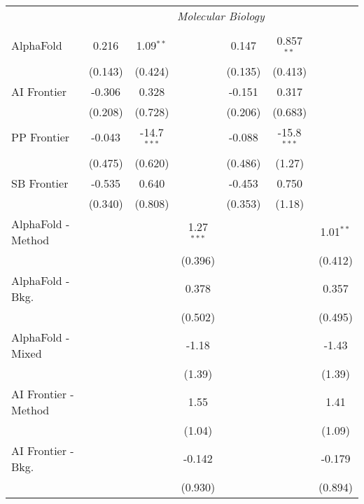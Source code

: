 \begin{tabular}{lcccccc}
 & \multicolumn{6}{c}{\textit{Molecular Biology}} \\ \\
   AlphaFold            & 0.216   & 1.09$^{**}$   &               & 0.147   & 0.857$^{**}$  &   \\   
                        & (0.143) & (0.424)       &               & (0.135) & (0.413)       &   \\   
   AI Frontier          & -0.306  & 0.328         &               & -0.151  & 0.317         &   \\   
                        & (0.208) & (0.728)       &               & (0.206) & (0.683)       &   \\   
   PP Frontier          & -0.043  & -14.7$^{***}$ &               & -0.088  & -15.8$^{***}$ &   \\   
                        & (0.475) & (0.620)       &               & (0.486) & (1.27)        &   \\   
   SB Frontier          & -0.535  & 0.640         &               & -0.453  & 0.750         &   \\   
                        & (0.340) & (0.808)       &               & (0.353) & (1.18)        &   \\   
   AlphaFold - Method   &         &               & 1.27$^{***}$  &         &               & 1.01$^{**}$\\   
                        &         &               & (0.396)       &         &               & (0.412)\\   
   AlphaFold - Bkg.     &         &               & 0.378         &         &               & 0.357\\   
                        &         &               & (0.502)       &         &               & (0.495)\\   
   AlphaFold - Mixed    &         &               & -1.18         &         &               & -1.43\\   
                        &         &               & (1.39)        &         &               & (1.39)\\   
   AI Frontier - Method &         &               & 1.55          &         &               & 1.41\\   
                        &         &               & (1.04)        &         &               & (1.09)\\   
   AI Frontier - Bkg.   &         &               & -0.142        &         &               & -0.179\\   
                        &         &               & (0.930)       &         &               & (0.894)\\   

\end{tabular}
